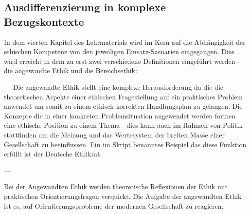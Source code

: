 \documentclass[journal]{IEEEtran}
\begin{document}
\begin{onecolumn}
\section{Ausdifferenzierung in komplexe Bezugskontexte}

In dem vierten Kapitel des Lehrmaterials wird im Kern auf die Abhängigkeit der ethischen Kompetenz von
den jeweiligen Einsatz-Szenarien eingegangen. Dies wird erreicht in dem zu erst zwei verschiedene Definitionen
eingeführt werden - die angewandte Ethik und die Bereichsethik:

--- Die angewandte Ethik stellt eine komplexe Herausforderung da die die theoretischen Aspekte einer ethischen
Fragestellung auf ein praktisches Problem anwendet um somit zu einem ethisch korrekten Handlungsplan zu gelangen.
Die Konzepte die in einer konkreten Problemsituation angewendet werden formen eine ethische Position zu einem Thema
 - dies kann auch im Rahmen von Politik stattfinden um die Meinung und das Wertesystem der breiten Masse einer
 Gesellschaft zu beeinflussen. Ein im Skript benanntes Beispiel das diese Funktion erfüllt ist der Deutsche Ethikrat.
 















---

Bei der Angewandten Ethik werden theoretische Reflexionen der Ethik mit praktischen Orientierungsfragen verquickt.
Die Aufgabe der angewandten Ethik ist es, auf Orientierungsprobleme der modernen Gesellschaft zu reagieren.



\end{onecolumn}
\end{document}
